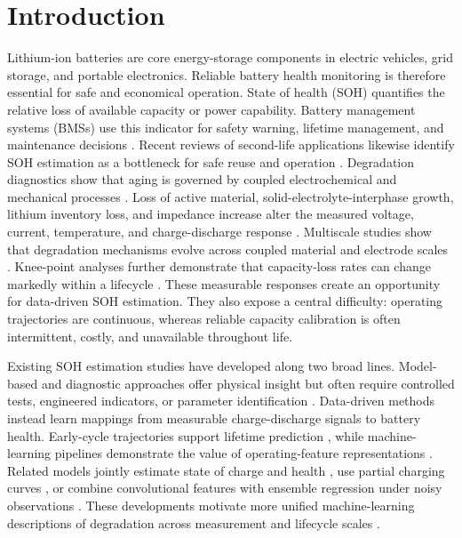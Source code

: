 \documentclass[pdflatex,sn-mathphys-num]{sn-jnl}
\begin{document}
\section{Introduction}

Lithium-ion batteries are core energy-storage components in electric vehicles, grid storage, and portable electronics. Reliable battery health monitoring is therefore essential for safe and economical operation. State of health (SOH) quantifies the relative loss of available capacity or power capability. Battery management systems (BMSs) use this indicator for safety warning, lifetime management, and maintenance decisions \cite{berecibar2016critical}. Recent reviews of second-life applications likewise identify SOH estimation as a bottleneck for safe reuse and operation \cite{vignesh2024state}. Degradation diagnostics show that aging is governed by coupled electrochemical and mechanical processes \cite{birkl2017degradation}. Loss of active material, solid-electrolyte-interphase growth, lithium inventory loss, and impedance increase alter the measured voltage, current, temperature, and charge-discharge response \cite{che2023health}. Multiscale studies show that degradation mechanisms evolve across coupled material and electrode scales \cite{zhang2023coupling}. Knee-point analyses further demonstrate that capacity-loss rates can change markedly within a lifecycle \cite{attia2022knees}. These measurable responses create an opportunity for data-driven SOH estimation. They also expose a central difficulty: operating trajectories are continuous, whereas reliable capacity calibration is often intermittent, costly, and unavailable throughout life.

Existing SOH estimation studies have developed along two broad lines. Model-based and diagnostic approaches offer physical insight but often require controlled tests, engineered indicators, or parameter identification \cite{dubarry2022best}. Data-driven methods instead learn mappings from measurable charge-discharge signals to battery health. Early-cycle trajectories support lifetime prediction \cite{severson2019data}, while machine-learning pipelines demonstrate the value of operating-feature representations \cite{roman2021machine}. Related models jointly estimate state of charge and health \cite{ng2020predicting}, use partial charging curves \cite{lyu2021partial}, or combine convolutional features with ensemble regression under noisy observations \cite{yang2022robust}. These developments motivate more unified machine-learning descriptions of degradation across measurement and lifecycle scales \cite{li2022towards}.
\end{document}

